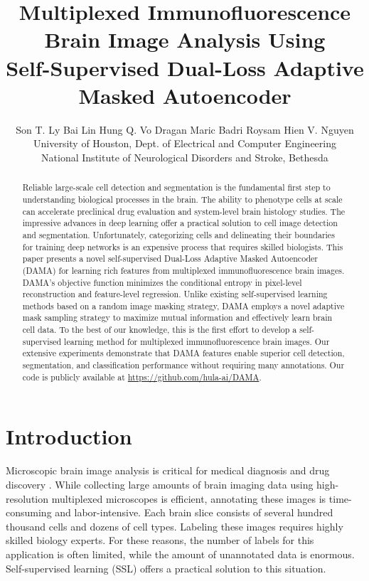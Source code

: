 \documentclass[10pt,twocolumn,letterpaper]{article}
\newcommand{\authorskip}{\hspace{2.5mm}}
\begin{document}
\title{Multiplexed Immunofluorescence Brain Image Analysis Using \\ Self-Supervised Dual-Loss Adaptive Masked Autoencoder}

\author{Son T. Ly \authorskip Bai Lin \authorskip Hung Q. Vo \authorskip Dragan Maric \authorskip Badri Roysam \authorskip Hien V. Nguyen \\ [2mm]
University of Houston, Dept. of Electrical and Computer Engineering \\
National Institute of Neurological Disorders and Stroke, Bethesda}
\maketitle



\begin{abstract}
Reliable large-scale cell detection and segmentation is the fundamental first step to understanding biological processes in the brain. The ability to phenotype cells at scale can accelerate preclinical drug evaluation and system-level brain histology studies. The impressive advances in deep learning offer a practical solution to cell image detection and segmentation. Unfortunately, categorizing cells and delineating their boundaries for training deep networks is an expensive process that requires skilled biologists. This paper presents a novel self-supervised  Dual-Loss Adaptive Masked Autoencoder (DAMA) for learning rich features from multiplexed immunofluorescence brain images. DAMA's objective function minimizes the conditional entropy in pixel-level reconstruction and feature-level regression. Unlike existing self-supervised learning methods based on a random image masking strategy, DAMA employs a novel adaptive mask sampling strategy to maximize mutual information and effectively learn brain cell data. To the best of our knowledge, this is the first effort to develop a self-supervised learning method for multiplexed immunofluorescence brain images. Our extensive experiments demonstrate that DAMA features enable superior cell detection, segmentation, and classification performance without requiring many annotations. Our code is publicly available at \url{https://github.com/hula-ai/DAMA}.
\end{abstract}

\section{Introduction}
Microscopic brain image analysis is critical for medical diagnosis and drug discovery \cite{maric2021whole}. While collecting large amounts of brain imaging data using high-resolution multiplexed microscopes is efficient, annotating these images is time-consuming and labor-intensive. Each brain slice consists of several hundred thousand cells and dozens of cell types. Labeling these images requires highly skilled biology experts. For these reasons, the number of labels for this application is often limited, while the amount of unannotated data is enormous. Self-supervised learning (SSL) offers a practical solution to this situation. 
\end{document}
